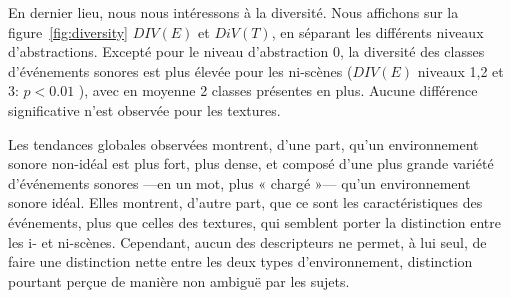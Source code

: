 En dernier lieu, nous nous intéressons à la diversité. Nous affichons sur la figure~\ref{fig:diversity} $DIV(E)$ et $DiV(T)$, en séparant les différents niveaux d'abstractions. Excepté pour le niveau d'abstraction 0, la diversité des classes d'événements sonores est plus élevée pour les ni-scènes ($DIV(E)$ niveaux 1,2 et 3: $p<0.01$ ), avec en moyenne 2 classes présentes en plus. Aucune différence significative n'est observée pour les textures.

Les tendances globales observées montrent, d'une part, qu'un environnement sonore non-idéal est plus fort, plus dense, et composé d'une plus grande variété d'événements sonores ---en un mot, plus « chargé »--- qu'un environnement sonore idéal. Elles montrent, d'autre part, que ce sont les caractéristiques des événements, plus que celles des textures, qui semblent porter la distinction entre les i- et ni-scènes. Cependant, aucun des descripteurs ne permet, à lui seul, de faire une distinction nette entre les deux types d'environnement, distinction pourtant perçue de manière non ambiguë par les sujets.

